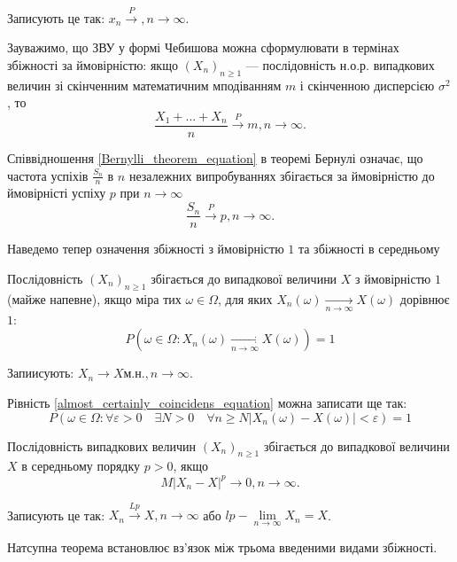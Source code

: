 Записують це так: $x_n \xrightarrow{P}, n \rightarrow \infty$.

Зауважимо, що ЗВУ у формі Чебишова можна
сформулювати в термінах збіжності за ймовірністю:
якщо $(X_n)_{n \geqslant 1}$ --- послідовність н.о.р.
випадкових величин зі скінченним математичним
мподіванням $m$ і скінченною дисперсією $\sigma^2$ , то
$$\dfrac{X_1 + ... + X_n}{n} \xrightarrow{P} m, n \rightarrow \infty.$$

Співвідношення \ref{Bernylli_theorem_equation}
в теоремі Бернулі означає, що частота
успіхів $\frac{S_n}{n}$ в $n$ незалежних
випробуваннях збігається за ймовірністю
до ймовірністі успіху $p$ при $n \rightarrow \infty$
$$\dfrac{S_n}{n} \xrightarrow{P} p, n \rightarrow \infty.$$

Наведемо тепер означення збіжності з
ймовірністю $1$ та збіжності в середньому

\begin{definition}
    Послідовність $(X_n)_{n \geqslant 1}$ збігається
    до випадкової величини $X$ з ймовірністю $1$ (майже
    напевне), якщо міра тих $\omega \in \Omega$, для яких
    $X_n(\omega) \xrightarrow[n \rightarrow \infty]{} X(\omega)$
    дорівнює $1$:
    \begin{equation}
        \label{almost_certainly_coincidens_equation}
        P(\omega \in \Omega: X_n (\omega) \xrightarrow[n \rightarrow \infty]{} X(\omega)) = 1
    \end{equation}
\end{definition}

Запиисують: $X_n \rightarrow X \text{м.н.}, n \rightarrow \infty.$  

Рівність \ref{almost_certainly_coincidens_equation}
можна записати ще так:
\begin{equation}
    P(\omega \in \Omega: \forall \varepsilon > 0 \quad \exists N > 0 \quad \forall n \geqslant N 
        |X_n(\omega) - X(\omega)| < \varepsilon) = 1
\end{equation}

\begin{definition}
    Послідовність випадкових величин $(X_n)_{n \geqslant 1}$
    збігається до випадкової величини $X$ 
    в середньому порядку $p > 0$, якщо 
    $$M|X_n - X|^p \rightarrow 0, n \rightarrow \infty.$$
\end{definition}
Записують це так: $X_n \xrightarrow{Lp} X, n \rightarrow \infty$
або $lp - \lim\limits_{n \rightarrow \infty} X_n = X$.

Натсупна теорема встановлює вз'язок між
трьома введеними видами збіжності.

